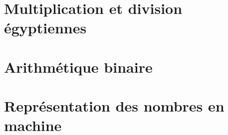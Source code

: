 \documentclass[10pt]{beamer}
\begin{document}
\section{Multiplication et division égyptiennes}



\section{Arithmétique binaire}



\section{Représentation des nombres en machine}



 \questionSlide

 \appendix
 \backupSlides







\end{document}
